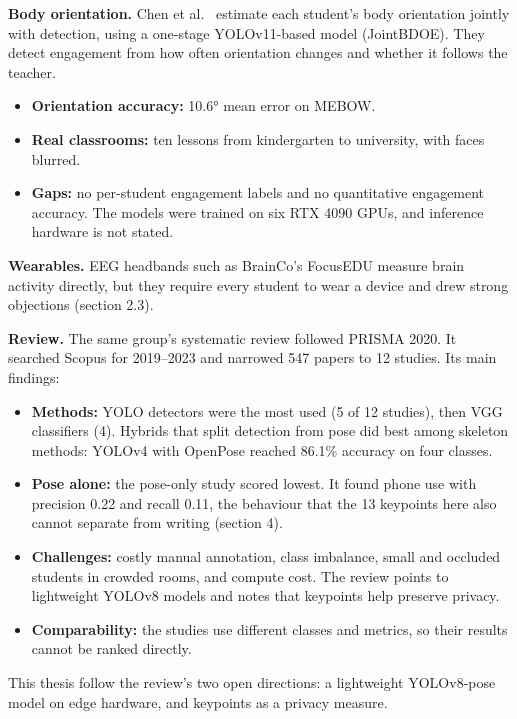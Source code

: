 \textbf{Body orientation.} Chen et al.~\cite{b1} estimate each student's body orientation jointly with detection, using a one-stage YOLOv11-based model (JointBDOE). They detect engagement from how often orientation changes and whether it follows the teacher.

\begin{itemize}
\tightlist
\item
  \textbf{Orientation accuracy:} 10.6° mean error on MEBOW.
\item
  \textbf{Real classrooms:} ten lessons from kindergarten to university, with faces blurred.
\item
  \textbf{Gaps:} no per-student engagement labels and no quantitative engagement accuracy. The models were trained on six RTX 4090 GPUs, and inference hardware is not stated.
\end{itemize}

\textbf{Wearables.} EEG headbands such as BrainCo's FocusEDU measure brain activity directly, but they require every student to wear a device and drew strong objections (section 2.3).

\textbf{Review.} The same group's systematic review \cite{b4} followed PRISMA 2020. It searched Scopus for 2019--2023 and narrowed 547 papers to 12 studies. Its main findings:

\begin{itemize}
\tightlist
\item
  \textbf{Methods:} YOLO detectors were the most used (5 of 12 studies), then VGG classifiers (4). Hybrids that split detection from pose did best among skeleton methods: YOLOv4 with OpenPose reached 86.1\% accuracy on four classes.
\item
  \textbf{Pose alone:} the pose-only study scored lowest. It found phone use with precision 0.22 and recall 0.11, the behaviour that the 13 keypoints here also cannot separate from writing (section 4).
\item
  \textbf{Challenges:} costly manual annotation, class imbalance, small and occluded students in crowded rooms, and compute cost. The review points to lightweight YOLOv8 models and notes that keypoints help preserve privacy.
\item
  \textbf{Comparability:} the studies use different classes and metrics, so their results cannot be ranked directly.
\end{itemize}

This thesis follow the review's two open directions: a lightweight YOLOv8-pose model on edge hardware, and keypoints as a privacy measure.

